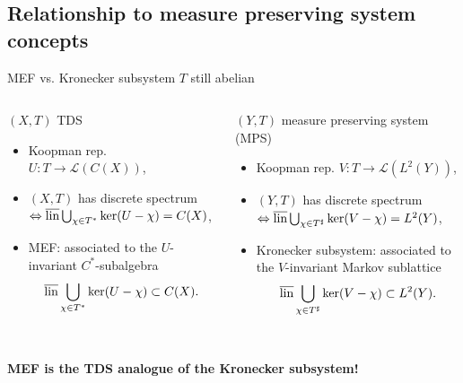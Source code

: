 \subsection{Relationship to measure preserving system concepts}
\begin{frame}{MEF vs. Kronecker subsystem}
  $T$ still abelian
  \begin{columns}[T]
    \begin{column}{0.5\textwidth}
      $(X,T)$ TDS
      \begin{itemize}
        \item {} Koopman rep. $U : T \to \mathscr{L}(C(X))$,
        \item {}$(X,T)$ has discrete spectrum $\Leftrightarrow \overline{\operatorname{lin}} \bigcup_{\chi \in T^*} \ker (U- \chi) = C(X)$,
        \item {} MEF: associated to the $U$-invariant $C^*$-subalgebra
          \begin{equation*}
            \overline{\operatorname{lin}} \bigcup_{\chi \in T^*} \ker (U- \chi)  \subset C(X).
          \end{equation*}
      \end{itemize}
    \end{column}
\begin{column}{0.5\textwidth}
  $(Y,T)$ measure preserving system (MPS)
  \begin{itemize}
    \item {} Koopman rep. $V: T \to \mathscr{L}(L^2(Y))$,
    \item {}$(Y,T)$ has discrete spectrum $\Leftrightarrow \overline{\operatorname{lin}} \bigcup_{\chi \in T^\sharp} \ker (V- \chi) = L^2(Y)$,
    \item {} Kronecker subsystem: associated to the $V$-invariant Markov sublattice 
      \begin{equation*}
        \overline{\operatorname{lin}} \bigcup_{\chi \in T^\sharp} \ker (V- \chi)  \subset L^2(Y).
      \end{equation*}
  \end{itemize}
    \end{column}
  \end{columns}
  \centering
  \phantom{a}\\
  \textbf{MEF is the TDS analogue of the Kronecker subsystem!}
\end{frame}
